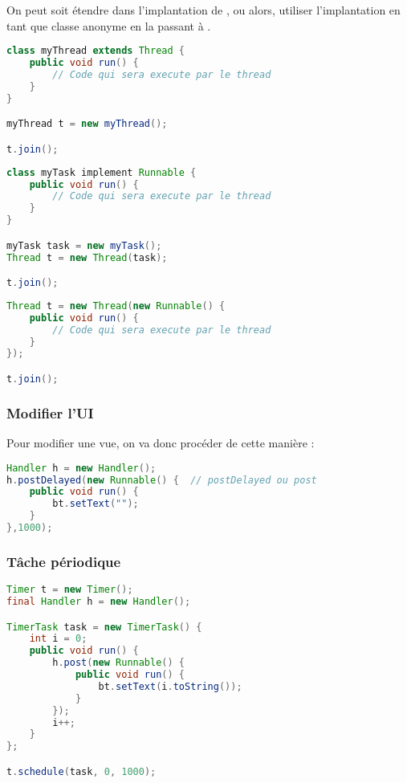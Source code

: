 On peut soit étendre  dans l'implantation de , ou alors, utiliser l'implantation en tant que classe anonyme en la passant à .

\begin{lstlisting}[language=java]
class myThread extends Thread {
    public void run() {
        // Code qui sera execute par le thread
    }
}

myThread t = new myThread();

t.join();
\end{lstlisting}

\begin{lstlisting}[language=java]
class myTask implement Runnable {
    public void run() {
        // Code qui sera execute par le thread
    }
}

myTask task = new myTask();
Thread t = new Thread(task);

t.join();
\end{lstlisting}

\begin{lstlisting}[language=java]
Thread t = new Thread(new Runnable() {
    public void run() {
        // Code qui sera execute par le thread
    }
});

t.join();
\end{lstlisting}

\subsubsection{Modifier l'UI}
Pour modifier une vue, on va donc procéder de cette manière :
\begin{lstlisting}[language=java]
Handler h = new Handler();
h.postDelayed(new Runnable() {  // postDelayed ou post
    public void run() {
        bt.setText("");
    }
},1000);
\end{lstlisting}


\subsubsection{Tâche périodique}
\begin{lstlisting}[language=java]
Timer t = new Timer();
final Handler h = new Handler();

TimerTask task = new TimerTask() {
    int i = 0;
    public void run() {
        h.post(new Runnable() {
            public void run() {
                bt.setText(i.toString());
            }
        });
        i++;
    }
};

t.schedule(task, 0, 1000);
\end{lstlisting}
